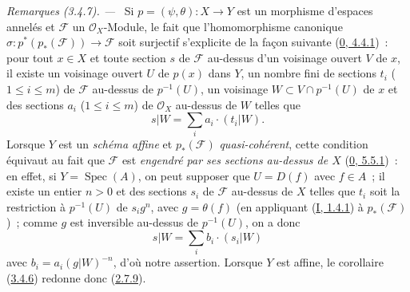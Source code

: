 \par\medskip\noindent\textit{Remarques (3.4.7). ---\ }
\label{II.3.4.7-fr}
Si $p=(\psi,\theta):X\to Y$ est un morphisme d'espaces annelés et
$\mathcal{F}$ un $\mathcal{O}_X$-Module, le fait que l'homomorphisme canonique
$\sigma:p^*(p_*(\mathcal{F}))\to\mathcal{F}$ soit surjectif s'explicite de la
façon suivante (\hyperref[0.4.4.1-fr]{0, 4.4.1})~: pour tout $x\in X$ et toute
section $s$ de $\mathcal{F}$ au-dessus d'un voisinage ouvert $V$ de $x$, il
existe un voisinage ouvert $U$ de $p(x)$ dans $Y$, un nombre fini de sections
$t_i$ ($1\leq i\leq m$) de $\mathcal{F}$ au-dessus de $p^{-1}(U)$, un
voisinage $W\subset V\cap p^{-1}(U)$ de $x$ et des sections $a_i$
($1\leq i\leq m$) de $\mathcal{O}_X$ au-dessus de $W$ telles que
\[
  s|W=\sum_i a_i\cdot(t_i|W).
\]
Lorsque $Y$ est un \emph{schéma affine} et $p_*(\mathcal{F})$
\emph{quasi-cohérent}, cette condition équivaut au fait que $\mathcal{F}$ est
\emph{engendré par ses sections au-dessus de $X$}
(\hyperref[0.5.5.1-fr]{0, 5.5.1})~: en effet, si
$Y=\operatorname{Spec}(A)$, on peut supposer que $U=D(f)$ avec $f\in A$~; il
existe un entier $n>0$ et des sections $s_i$ de $\mathcal{F}$ au-dessus de
$X$ telles que $t_i$ soit la restriction à $p^{-1}(U)$ de $s_ig^n$, avec
$g=\theta(f)$ (en appliquant (\hyperref[I.1.4.1-fr]{I, 1.4.1}) à
$p_*(\mathcal{F})$)~; comme $g$ est inversible au-dessus de $p^{-1}(U)$, on a
donc
\[
  s|W=\sum_i b_i\cdot(s_i|W)
\]
avec $b_i=a_i(g|W)^{-n}$, d'où notre assertion. Lorsque $Y$ est affine, le
corollaire (\hyperref[II.3.4.6-fr]{3.4.6}) redonne donc
(\hyperref[II.2.7.9-fr]{2.7.9}).

